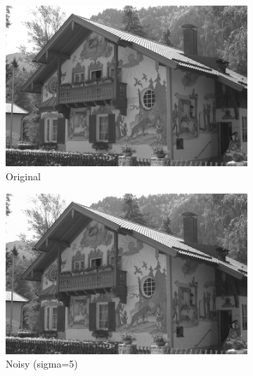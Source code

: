 \documentclass[12pt]{article}
\begin{document}
\begin{figure}[h]
    \centering
    \begin{subfigure}[b]{0.3\textwidth}
        \centering
        \includegraphics[width=\textwidth]{../images/kodak24.png}
        \caption{Original}
        \label{fig:subfig1}
    \end{subfigure}
    \begin{subfigure}[b]{0.3\textwidth}
        \centering
        \includegraphics[width=\textwidth]{../images/noisy_kodak_5.png}
        \caption{Noisy (sigma=5)}
        \label{fig:subfig2}
    \end{subfigure}
    \begin{subfigure}[b]{0.3\textwidth}
        \centering

\end{subfigure}
\end{figure}
\end{document}
